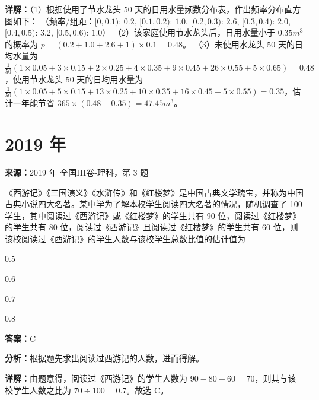 \begin{question}[points=12]
\begin{solution}
\textbf{详解：}（1）根据使用了节水龙头 $50$ 天的日用水量频数分布表，作出频率分布直方图如下：
（频率/组距：$[0,0.1)$: $0.2$, $[0.1,0.2)$: $1.0$, $[0.2,0.3)$: $2.6$, $[0.3,0.4)$: $2.0$, $[0.4,0.5)$: $3.2$, $[0.5,0.6)$: $1.0$）
（2）该家庭使用节水龙头后，日用水量小于 $0.35m^3$ 的概率为 $p=(0.2+1.0+2.6+1)\times0.1=0.48$。
（3）未使用水龙头 $50$ 天的日均水量为 $\frac{1}{50}(1\times0.05+3\times0.15+2\times0.25+4\times0.35+9\times0.45+26\times0.55+5\times0.65)=0.48$，使用节水龙头 $50$ 天的日均用水量为 $\frac{1}{50}(1\times0.05+5\times0.15+13\times0.25+10\times0.35+16\times0.45+5\times0.55)=0.35$，估计一年能节省 $365\times(0.48-0.35)=47.45m^3$。
\end{solution}
\end{question}

\section*{2019 年}

\begin{question}[points=5]
\textbf{来源：}2019 年 全国III卷-理科，第 3 题\par
《西游记》《三国演义》《水浒传》和《红楼梦》是中国古典文学瑰宝，并称为中国古典小说四大名著。某中学为了解本校学生阅读四大名著的情况，随机调查了 100 学生，其中阅读过《西游记》或《红楼梦》的学生共有 90 位，阅读过《红楼梦》的学生共有 80 位，阅读过《西游记》且阅读过《红楼梦》的学生共有 60 位，则该校阅读过《西游记》的学生人数与该校学生总数比值的估计值为
\begin{choices}
  \item $0.5$
  \item $0.6$
  \item $0.7$
  \item $0.8$
\end{choices}
\begin{solution}
\textbf{答案：}C

\textbf{分析：}根据题先求出阅读过西游记的人数，进而得解。

\textbf{详解：}由题意得，阅读过《西游记》的学生人数为 $90-80+60=70$，则其与该校学生人数之比为 $70 \div 100 = 0.7$。故选 C。
\end{solution}
\end{question}

